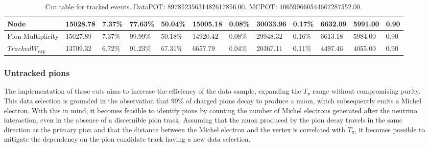 \begin{table}[!hbt]
\begin{tabular}{|*{12}{l|}}
 Node   & 15028.78     &   7.37\% &  77.63\% &  50.04\% & 15005.18 &   0.08\% & 30033.96     &   0.17\% & 6632.09     & 5991.00 &   0.90 \\ \hline
 Pion Multiplicity   & 15027.89     &   7.37\% &  99.99\% &  50.18\% & 14920.42 &   0.08\% & 29948.32     &   0.16\% & 6613.18     & 5984.00 &   0.90 \\ \hline
 $Tracked W_{exp}$   & 13709.32     &   6.72\% &  91.23\% &  67.31\% & 6657.79 &   0.04\% & 20367.11     &   0.11\% & 4497.46     & 4055.00 &   0.90 \\ \hline
    \end{tabular}
    \caption{Cut table for tracked events. DataPOT: 89785235631482617856.00. MCPOT: 406599660544667287552.00.}
    \label{tab:Analysis:Cuts:TrackedCutTable}
\end{table}



\pagebreak

\subsubsection{Untracked pions}
\label{Cap:Analysis:DataSelection:Cuts:UntrackedPions}
The implementation of these cuts aims to increase the efficiency of the data sample, expanding the $T_\pi$ range without compromising purity. This data selection is grounded in the observation that 99\% of charged pions decay to produce a muon, which subsequently emits a Michel electron. With this in mind, it becomes feasible to identify pions by counting the number of Michel electrons generated after the neutrino interaction, even in the absence of a discernible pion track. Assuming that the muon produced by the pion decay travels in the same direction as the primary pion and that the distance between the Michel electron and the vertex is correlated with $T_\pi$, it becomes possible to mitigate the dependency on the pion candidate track having a new data selection. 


